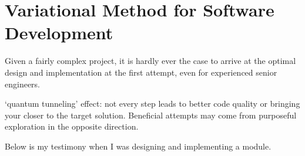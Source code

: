 
\chapter{Variational Method for Software Development} \label{ch:variational}
Given a fairly complex project, it is hardly ever the case to arrive at the optimal design and
implementation at the first attempt, even for experienced senior engineers.

`quantum tunneling' effect: not every step leads to better code quality or bringing your closer
to the target solution.
Beneficial attempts may come from purposeful exploration in the opposite direction.

Below is my testimony when I was designing and implementing a  module.
